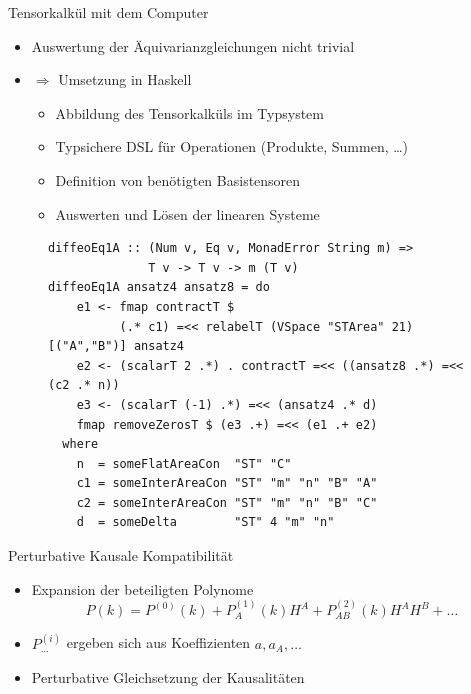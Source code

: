 \documentclass{beamer}
\begin{document}
    \begin{frame}[fragile]{Tensorkalkül mit dem Computer}
        \begin{itemize}
            \item Auswertung der Äquivarianzgleichungen nicht trivial
            \item $\Rightarrow$ Umsetzung in Haskell
            \begin{itemize}
                \item Abbildung des Tensorkalküls im Typsystem
                \item Typsichere DSL für Operationen (Produkte, Summen, \ldots)
                \item Definition von benötigten Basistensoren
                \item Auswerten und Lösen der linearen Systeme
            \end{itemize}
        \end{itemize}
        \begin{figure}
            \begin{verbatim}
diffeoEq1A :: (Num v, Eq v, MonadError String m) =>
              T v -> T v -> m (T v)
diffeoEq1A ansatz4 ansatz8 = do
    e1 <- fmap contractT $
          (.* c1) =<< relabelT (VSpace "STArea" 21) [("A","B")] ansatz4
    e2 <- (scalarT 2 .*) . contractT =<< ((ansatz8 .*) =<< (c2 .* n))
    e3 <- (scalarT (-1) .*) =<< (ansatz4 .* d)
    fmap removeZerosT $ (e3 .+) =<< (e1 .+ e2)
  where
    n  = someFlatAreaCon  "ST" "C"
    c1 = someInterAreaCon "ST" "m" "n" "B" "A"
    c2 = someInterAreaCon "ST" "m" "n" "B" "C"
    d  = someDelta        "ST" 4 "m" "n"
            \end{verbatim}
            \label{fig:haskell}
        \end{figure}
    \end{frame}

    \begin{frame}{Perturbative Kausale Kompatibilit\"at}
        \begin{itemize}
            \item Expansion der beteiligten Polynome
            \[ P(k) = P^{(0)}(k) + P^{(1)}_A(k) H^A + P^{(2)}_{AB}(k) H^A H^B + \ldots \]
            \item $P^{(i)}_{\dots}$ ergeben sich aus Koeffizienten $a, a_A, \ldots$
            \item Perturbative Gleichsetzung der Kausalitäten
        \end{itemize}
    \end{frame}
\end{document}
